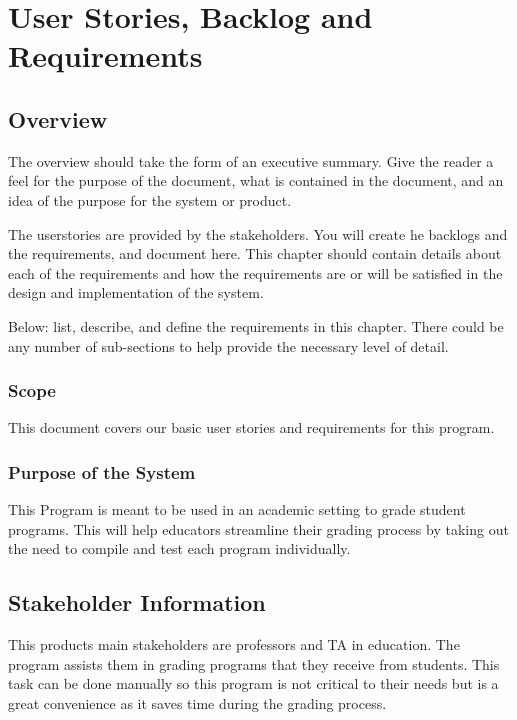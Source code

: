 \chapter{User Stories, Backlog and Requirements}
\section{Overview}


The overview should take the form of an executive summary.  Give the reader a feel 
for the purpose of the document, what is contained in the document, and an idea 
of the purpose for the system or product. 

 The userstories 
are provided by the stakeholders.  You will create he backlogs and the requirements, and document here.  
This chapter should contain 
details about each of the requirements and how the requirements are or will be 
satisfied in the design and implementation of the system.

Below:   list, describe, and define the requirements in this chapter.  
There could be any number of sub-sections to help provide the necessary level of 
detail. 





\subsection{Scope}
This document covers our basic user stories and requirements for this program.




\subsection{Purpose of the System}
This Program is meant to be used in an academic setting to grade student programs. 
This will help educators streamline their grading process by taking out the need to 
compile and test each program individually.



\section{ Stakeholder Information}
This products main stakeholders are professors and TA in education.
The program assists them in grading programs that they receive from students. 
This task can be done manually so this program is not critical to their needs but is a 
great convenience as it saves time during the grading process.

